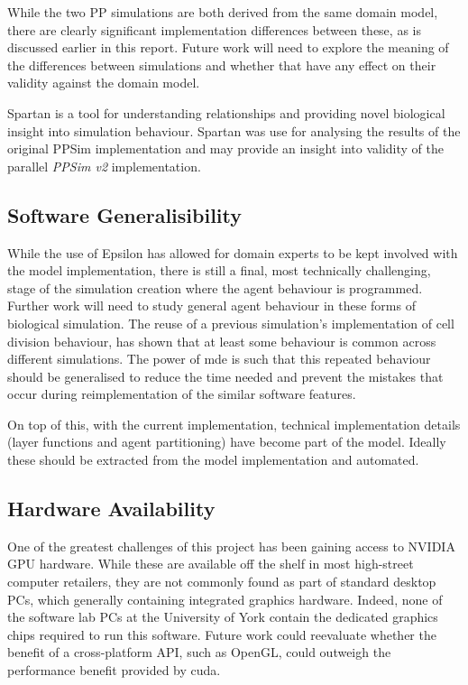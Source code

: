 \documentclass{UoYCSproject}
\begin{document}
While the two \gls{PP} simulations are both derived from the same domain model, there are clearly significant implementation differences between these, as is discussed earlier in this report.
Future work will need to explore the meaning of the differences between simulations and whether that have any effect on their validity against the domain model.

Spartan is a tool for understanding relationships and providing novel biological insight into simulation behaviour.
Spartan was use for analysing the results of the original PPSim implementation\cite{spartan} and may provide an insight into validity of the parallel \textit{PPSim v2} implementation.

\subsection{Software Generalisibility}%
While the use of Epsilon has allowed for domain experts to be kept involved with the model implementation, there is still a final, most technically challenging, stage of the simulation creation where the agent behaviour is programmed.
Further work will need to study general agent behaviour in these forms of biological simulation.
The reuse of a previous simulation's implementation of cell division behaviour, has shown that at least some behaviour is common across different simulations.
The power of \gls{mde} is such that this repeated behaviour should be generalised to reduce the time needed and prevent the mistakes that occur during reimplementation of the similar software features.

On top of this, with the current implementation, technical implementation details (layer functions and agent partitioning) have become part of the model.
Ideally these should be extracted from the model implementation and automated.

\subsection{Hardware Availability}
One of the greatest challenges of this project has been gaining access to NVIDIA GPU hardware.
While these are available off the shelf in most high-street computer retailers, they are not commonly found as part of standard desktop PCs, which generally containing integrated graphics hardware.
Indeed, none of the software lab PCs at the University of York contain the dedicated graphics chips required to run this software.
Future work could reevaluate whether the benefit of a cross-platform API, such as OpenGL, could outweigh the performance benefit provided by \acrshort{cuda}.
\end{document}
